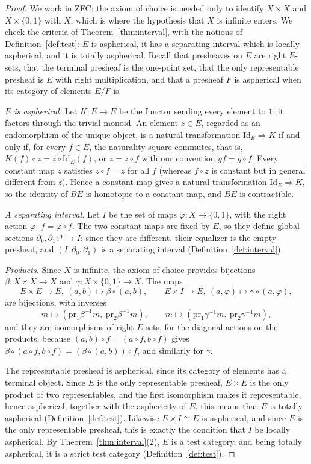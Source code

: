 \documentclass[11pt]{amsart}
\theoremstyle{definition}
\theoremstyle{remark}
\numberwithin{figure}{section}%
\begin{document}
\begin{proof}
We work in ZFC: the axiom of choice is needed only to identify $X\times X$ and $X\times\{0,1\}$ with $X$, which is where the hypothesis that $X$ is infinite enters. We check the criteria of Theorem~\ref{thm:interval}, with the notions of Definition~\ref{def:test}: $E$ is aspherical, it has a separating interval which is locally aspherical, and it is totally aspherical. Recall that presheaves on $E$ are right $E$-sets, that the terminal presheaf is the one-point set, that the only representable presheaf is $E$ with right multiplication, and that a presheaf $F$ is aspherical when its category of elements $E/F$ is.

\emph{$E$ is aspherical.} Let $K\colon E\to E$ be the functor sending every element to $1$; it factors through the trivial monoid. An element $z\in E$, regarded as an endomorphism of the unique object, is a natural transformation $\mathrm{Id}_E\Rightarrow K$ if and only if, for every $f\in E$, the naturality square commutes, that is, $K(f)\circ z=z\circ\mathrm{Id}_E(f)$, or $z=z\circ f$ with our convention $gf=g\circ f$. Every constant map $z$ satisfies $z\circ f=z$ for all $f$ (whereas $f\circ z$ is constant but in general different from $z$). Hence a constant map gives a natural transformation $\mathrm{Id}_E\Rightarrow K$, so the identity of $BE$ is homotopic to a constant map, and $BE$ is contractible.

\emph{A separating interval.} Let $I$ be the set of maps $\varphi\colon X\to\{0,1\}$, with the right action $\varphi\cdot f=\varphi\circ f$. The two constant maps are fixed by $E$, so they define global sections $\partial_0,\partial_1\colon*\to I$; since they are different, their equalizer is the empty presheaf, and $(I,\partial_0,\partial_1)$ is a separating interval (Definition~\ref{def:interval}).

\emph{Products.} Since $X$ is infinite, the axiom of choice provides bijections $\beta\colon X\times X\to X$ and $\gamma\colon X\times\{0,1\}\to X$. The maps
\[
E\times E\to E,\ (a,b)\mapsto\beta\circ(a,b),\qquad E\times I\to E,\ (a,\varphi)\mapsto\gamma\circ(a,\varphi),
\]
are bijections, with inverses
\[
m\mapsto(\mathrm{pr}_1\beta^{-1}m,\ \mathrm{pr}_2\beta^{-1}m),\qquad m\mapsto(\mathrm{pr}_1\gamma^{-1}m,\ \mathrm{pr}_2\gamma^{-1}m),
\]
and they are isomorphisms of right $E$-sets, for the diagonal actions on the products, because $(a,b)\circ f=(a\circ f,b\circ f)$ gives $\beta\circ(a\circ f,b\circ f)=(\beta\circ(a,b))\circ f$, and similarly for $\gamma$. 

The representable presheaf is aspherical, since its category of elements has a terminal object. Since $E$ is the only representable presheaf, $E\times E$ is the only product of two representables, and the first isomorphism makes it representable, hence aspherical; together with the asphericity of $E$, this means that $E$ is totally aspherical (Definition~\ref{def:test}). Likewise $E\times I\cong E$ is aspherical, and since $E$ is the only representable presheaf, this is exactly the condition that $I$ be locally aspherical. By Theorem~\ref{thm:interval}(2), $E$ is a test category, and being totally aspherical, it is a strict test category (Definition~\ref{def:test}).
\end{proof}
\end{document}

